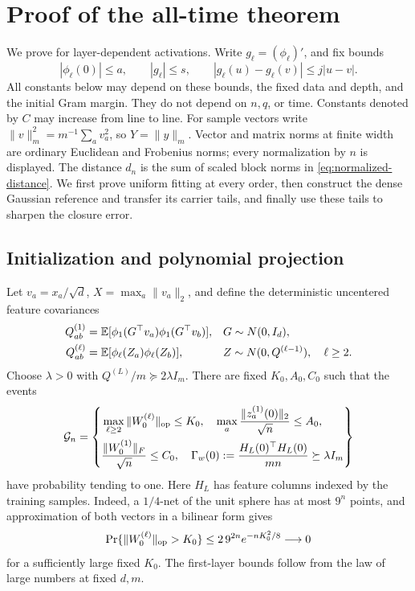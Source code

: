 \section{Proof of the all-time theorem}
\label{app:proof-alltime}

We prove  for layer-dependent activations.  Write
$g_\ell=(\phi_\ell)'$, and fix bounds
\[
 |\phi_\ell(0)|\le a,\qquad |g_\ell|\le s,\qquad
 |g_\ell(u)-g_\ell(v)|\le j|u-v|.
\]
All constants below may depend on these bounds, the fixed data and depth,
and the initial Gram margin.  They do not depend on $n,q$, or time.
Constants denoted by $C$ may increase from line to line.  For sample vectors
write $\|v\|_m^2=m^{-1}\sum_a v_a^2$, so $Y=\|y\|_m$.
Vector and matrix norms at finite width are ordinary Euclidean and
Frobenius norms; every normalization by $n$ is displayed.
The distance $d_n$ is the sum of scaled block norms in
\eqref{eq:normalized-distance}.  We first prove uniform fitting at every
order, then construct the dense Gaussian reference and transfer its carrier
tails, and finally use these tails to sharpen the closure error.

\subsection{Initialization and polynomial projection}

Let $v_a=x_a/\sqrt d$, $X=\max_a\|v_a\|_2$, and define the deterministic
uncentered feature covariances
\begin{align}
 Q^{(1)}_{ab}&=\mathbb{E}[\phi_1(G^\top v_a)\phi_1(G^\top v_b)],
       &&G\sim N(0,I_d),\nonumber\\
 Q^{(\ell)}_{ab}&=\mathbb{E}[\phi_\ell(Z_a)\phi_\ell(Z_b)],
       &&Z\sim N(0,Q^{(\ell-1)}),\quad\ell\ge2.
 \label{eq:at-initial-covariance}
\end{align}
Choose $\lambda>0$ with $Q^{(L)}/m\succeq2\lambda I_m$.
There are fixed $K_0,A_0,C_0$ such that the events
\begin{equation}
 \mathcal G_n=\left\{\begin{aligned}
 &
 \max_{\ell\ge2}\|W_0^{(\ell)}\|_{\rm op}\le K_0,\quad
 \max_a\frac{\|z_a^{(1)}(0)\|_2}{\sqrt n}\le A_0,\\
 &
 \frac{\|W_0^{(1)}\|_F}{\sqrt n}\le C_0,\quad
 \Gamma_w(0):=\frac{H_L(0)^\top H_L(0)}{mn}\succeq\lambda I_m
 \end{aligned}\right\}
 \label{eq:at-good-event}
\end{equation}
have probability tending to one.  Here $H_L$ has feature columns indexed
by the training samples.  Indeed, a $1/4$-net of the unit sphere has at
most $9^n$ points, and approximation of both vectors in a bilinear form
gives
\[
 \Pr\{\|W_0^{(\ell)}\|_{\rm op}>K_0\}
 \le2\,9^{2n}e^{-nK_0^2/8}\longrightarrow0
\]
for a sufficiently large fixed $K_0$.  The first-layer bounds follow from
the law of large numbers at fixed $d,m$.

